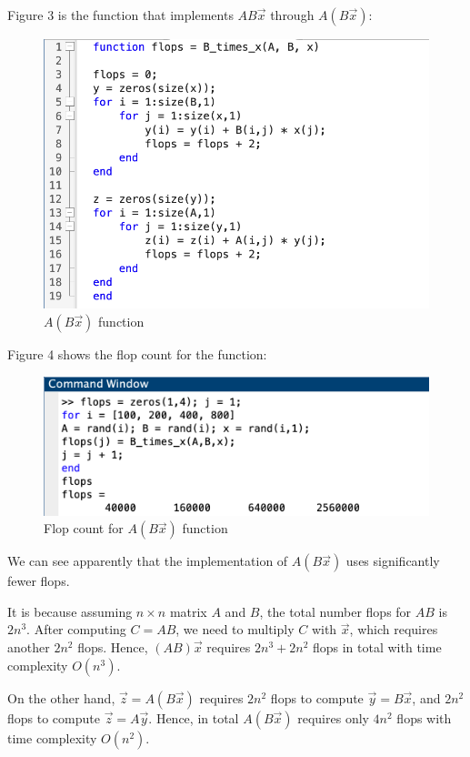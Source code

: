 \documentclass{article}
\begin{document}
Figure 3 is the function that implements $AB\vec{x}$ through $A(B\vec{x})$:
\begin{figure}[h]
    \centering
    \includegraphics[scale = 0.5]{B_times_x_function.png}
    \caption{$A(B\vec{x})$ function}
\end{figure}

Figure 4 shows the flop count for the function:
\begin{figure}[h]
    \centering
    \includegraphics[scale = 0.5]{B_times_x_flops.png}
    \caption{Flop count for $A(B\vec{x})$ function}
\end{figure}

We can see apparently that the implementation of $A(B\vec{x})$ uses significantly fewer flops.

It is because assuming $n \times n$ matrix $A$ and $B$, the total number flops for $AB$ is $2n^3$.
After computing $C = AB$, we need to multiply $C$ with $\vec{x}$, which requires another $2n^2$ flops. 
Hence, $(AB)\vec{x}$ requires $2n^3 + 2n^2$ flops in total with time complexity $O(n^3)$.

On the other hand, $\vec{z} = A(B\vec{x})$ requires $2n^2$ flops to compute $\vec{y} = B\vec{x}$, and $2n^2$ flops to compute $\vec{z} = A\vec{y}$.
Hence, in total $A(B\vec{x})$ requires only $4n^2$ flops with time complexity $O(n^2)$.
\bigbreak
\end{document}
